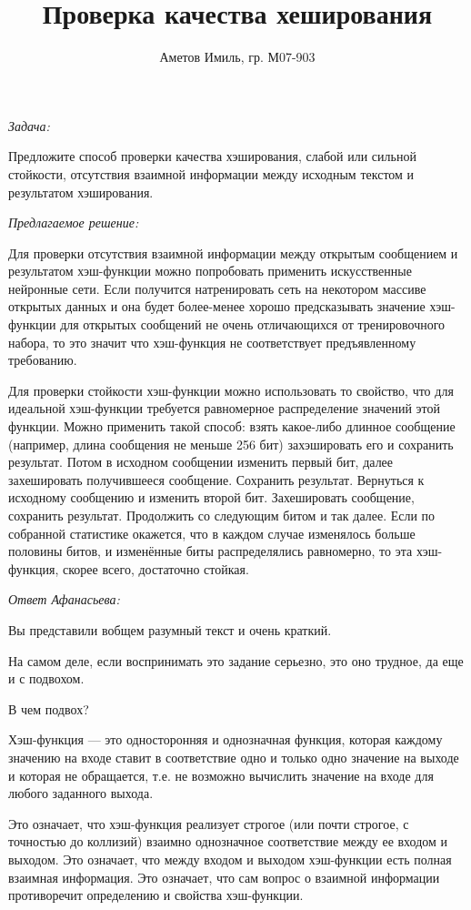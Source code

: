 \documentclass[10pt]{article}
\author{Аметов Имиль, гр. М07-903}
\title{Проверка качества хеширования}
\begin{document}
\maketitle

\emph{Задача:}

Предложите способ проверки качества хэширования, слабой или сильной стойкости, отсутствия взаимной информации между исходным текстом и результатом хэширования.

\emph{Предлагаемое решение:}

Для проверки отсутствия взаимной информации между открытым сообщением и результатом хэш-функции можно попробовать применить искусственные нейронные сети. Если получится натренировать сеть на некотором массиве открытых данных и она будет более-менее хорошо предсказывать значение хэш-функции для открытых сообщений не очень отличающихся от тренировочного набора, то это значит что хэш-функция не соответствует предъявленному требованию.

Для проверки стойкости хэш-функции можно использовать то свойство, что для идеальной хэш-функции требуется равномерное распределение значений этой функции. Можно применить такой способ: взять какое-либо длинное сообщение (например, длина сообщения не меньше 256 бит) захэшировать его и сохранить результат. Потом в исходном сообщении изменить первый бит, далее захешировать получившееся сообщение. Сохранить результат. Вернуться к исходному сообщению и изменить второй бит. Захешировать сообщение, сохранить результат. Продолжить со следующим битом и так далее. Если по собранной статистике окажется, что в каждом случае изменялось больше половины битов, и изменённые биты распределялись равномерно, то эта хэш-функция, скорее всего, достаточно стойкая.

\emph{Ответ Афанасьева:}

Вы представили вобщем разумный текст и очень краткий.

На самом деле, если воспринимать это задание серьезно, это оно трудное, да еще и с подвохом.

В чем подвох?

Хэш-функция --- это односторонняя и однозначная функция, которая каждому значению на входе ставит в соответствие одно и только одно значение на выходе и которая не обращается, т.е. не возможно вычислить значение на входе для любого заданного выхода.

Это означает, что хэш-функция реализует строгое (или почти строгое, с точностью до коллизий) взаимно однозначное соответствие между ее входом и выходом. Это означает, что между входом и выходом хэш-функции есть полная взаимная информация. Это означает, что сам вопрос о взаимной информации противоречит определению и свойства хэш-функции.
\end{document}
